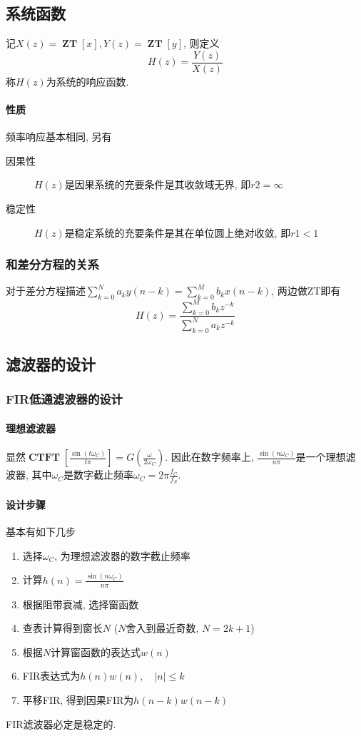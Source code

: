 \documentclass{ctexart}
\DeclareMathOperator{\CTFT}{\mathbf{CTFT}}
\DeclareMathOperator{\ZT}{\mathbf{ZT}}
\begin{document}
\subsection{系统函数}
    记$X(z) = \ZT[x], Y(z) = \ZT[y]$, 则定义\[H(z) = \frac{Y(z)}{X(z)}\]称$H(z)$为系统的响应函数.\par
\paragraph{性质} 频率响应基本相同, 另有\begin{description}
        \item[因果性] $H(z)$是因果系统的充要条件是其收敛域无界, 即$r2 = \infty$
        \item[稳定性] $H(z)$是稳定系统的充要条件是其在单位圆上绝对收敛, 即$r1 < 1$
    \end{description}
\subsubsection{和差分方程的关系}
    对于差分方程描述$\sum_{k = 0}^N a_k y(n - k) = \sum_{k = 0}^M b_k x(n - k)$, 两边做ZT即有
    \[
        H(z) = \frac { \sum_{k = 0}^M b_k z^{-k}} {\sum_{k = 0}^N a_k z^{-k}}
    \]

\subsection{滤波器的设计}
\subsubsection{FIR低通滤波器的设计}
\paragraph{理想滤波器} 显然$\CTFT[\frac{\sin(t \omega_C)}{t \pi}] = G(\frac{\omega}{2\omega_C})$.
    因此在数字频率上, $\frac{\sin(n \omega_C)}{n \pi}$是一个理想滤波器,
    其中$\omega_C$是数字截止频率$\omega_C = 2\pi \frac{f_C}{f_S}$.
\paragraph{设计步骤} 基本有如下几步 \begin{enumerate}
        \item 选择$\omega_C$, 为理想滤波器的数字截止频率
        \item 计算$h(n) = \frac{\sin(n \omega_C)}{n \pi}$
        \item 根据阻带衰减, 选择窗函数
        \item 查表计算得到窗长$N$ ($N$舍入到最近奇数, $N = 2k +1$)
        \item 根据$N$计算窗函数的表达式$w(n)$
        \item FIR表达式为$h(n)w(n),\quad |n| \le k$
        \item 平移FIR, 得到因果FIR为$h(n-k)w(n-k)$
    \end{enumerate}
    FIR滤波器必定是稳定的.
\end{document}
